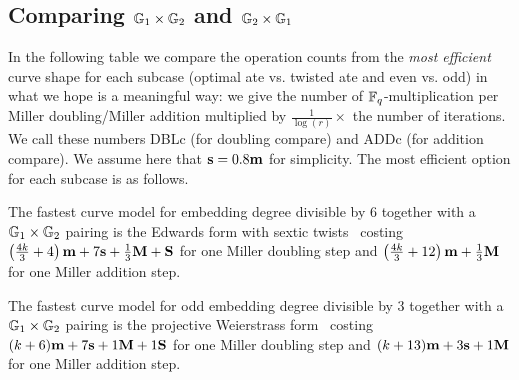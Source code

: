 \subsection{Comparing $\mathbb{G}_{1} \times \mathbb{G}_{2}$ and $\mathbb{G}_{2} \times \mathbb{G}_{1}$}

In the following table we compare the operation counts from the \emph{most efficient} 
curve shape for each subcase
(optimal ate vs. twisted ate and even vs. odd)
in what we hope is a meaningful way:
we give the number of $\mathbb{F}_{q}$-multiplication per Miller doubling/Miller addition multiplied by 
$\frac{1}{\log(r)} \times $ the number of iterations. We call these numbers DBLc 
(for doubling compare) and ADDc (for addition compare).
We assume here that $\textbf{s} = 0.8\textbf{m}$ for simplicity.
The most efficient option for each subcase is as follows.

The fastest curve model for embedding degree divisible by 6 together with a $\mathbb{G}_{1} \times \mathbb{G}_{2}$ pairing
is the Edwards form with sextic twists~\cite{2014/LWZ}
costing
$\left(\frac{4k}{3}+ 4\right)\textbf{m} + 7\textbf{s}  + \frac{1}{3}\textbf{M} + \textbf{S}$
for one Miller doubling step and
$\left(\frac{4k}{3} + 12\right)\textbf{m}  + \frac{1}{3}\textbf{M}$
for one Miller addition step.

The fastest curve model for odd embedding degree divisible by 3 together with a $\mathbb{G}_{1} \times \mathbb{G}_{2}$ pairing %
is the projective Weierstrass form~\cite{2009/craig}
costing
$(k+6)\textbf{m} + 7\textbf{s} + 1\textbf{M} + 1\textbf{S}$
for one Miller doubling step and
$(k+13)\textbf{m} + 3\textbf{s} + 1\textbf{M}$
for one Miller addition step.


